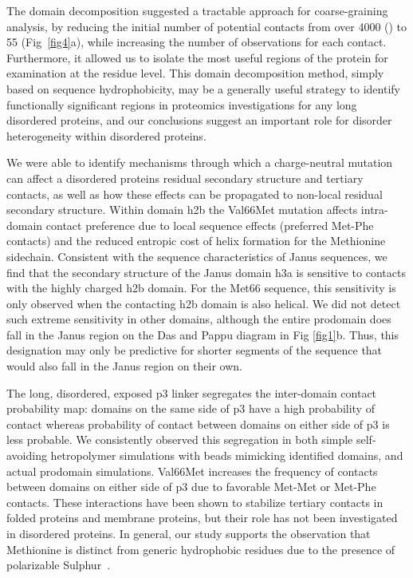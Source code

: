 \documentclass[10pt,letterpaper]{article}
\begin{document}
The domain decomposition suggested a tractable approach for coarse-graining analysis, by reducing the initial number of potential contacts from over 4000 () to 55 (Fig~\ref{fig4}a), while increasing the number of observations for each contact. Furthermore, it allowed us to isolate the most useful regions of the protein for examination at the residue level. This domain decomposition method, simply based on sequence hydrophobicity, may be a generally useful strategy to identify functionally significant regions in proteomics investigations for any long disordered proteins, and our conclusions suggest an important role for disorder heterogeneity within disordered proteins. 

We were able to identify mechanisms through which a charge-neutral mutation can affect a disordered proteins residual secondary structure and tertiary contacts, as well as how these effects can be propagated to non-local residual secondary structure. Within domain h2b the Val66Met mutation affects intra-domain contact preference due to local sequence effects (preferred Met-Phe contacts) and the reduced entropic cost of helix formation for the Methionine sidechain. Consistent with the sequence characteristics of Janus sequences, we find that the secondary structure of the Janus domain h3a is sensitive to contacts with the highly charged h2b domain. For the Met66 sequence, this sensitivity is only observed when the contacting h2b domain is also helical. We did not detect such extreme sensitivity in other domains, although the entire prodomain does fall in the Janus region on the Das and Pappu diagram in Fig \ref{fig1}b. Thus, this designation may only be predictive for shorter segments of the sequence that would also fall in the Janus region on their own.  

The long, disordered, exposed p3 linker segregates the inter-domain contact probability map: domains on the same side of p3 have a high probability of contact whereas probability of contact between domains on either side of p3 is less probable. We consistently observed this segregation in both simple self-avoiding hetropolymer simulations with beads mimicking identified domains, and actual prodomain simulations. Val66Met increases the frequency of contacts between domains on either side of p3 due to favorable Met-Met or Met-Phe contacts. These interactions have been shown to stabilize tertiary contacts in folded proteins and membrane proteins, but their role has not been investigated in disordered proteins. In general, our study supports the observation that Methionine is distinct from generic hydrophobic residues due to the presence of polarizable Sulphur~\cite{Gomez-Tamayo2016, Lim2019}. 
\end{document}
